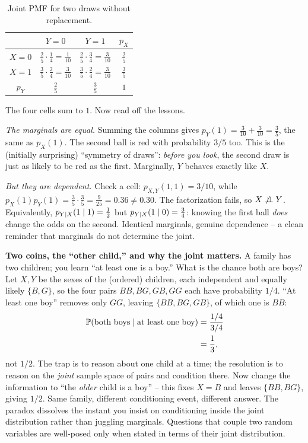\begin{example}
\begin{table}[H]
\centering
\begin{tabular}{c|cc|c}
 & $Y=0$ & $Y=1$ & $p_X$ \\
\hline
$X=0$ & $\tfrac{2}{5}\cdot\tfrac14 = \tfrac{1}{10}$
      & $\tfrac{2}{5}\cdot\tfrac34 = \tfrac{3}{10}$ & $\tfrac{2}{5}$ \\[0.6ex]
$X=1$ & $\tfrac{3}{5}\cdot\tfrac24 = \tfrac{3}{10}$
      & $\tfrac{3}{5}\cdot\tfrac24 = \tfrac{3}{10}$ & $\tfrac{3}{5}$ \\[0.6ex]
\hline
$p_Y$ & $\tfrac{2}{5}$ & $\tfrac{3}{5}$ & $1$ \\
\end{tabular}
\caption{Joint PMF for two draws without replacement.}
\label{ch13:tab-without-replacement}
\end{table}

The four cells sum to $1$. Now read off the lessons.

\emph{The marginals are equal.} Summing the columns gives
$p_Y(1) = \tfrac{3}{10}+\tfrac{3}{10} = \tfrac{3}{5}$, the same as $p_X(1)$. The
second ball is red with probability $3/5$ too. This is the (initially surprising)
``symmetry of draws'': \emph{before you look}, the second draw is just as likely
to be red as the first. Marginally, $Y$ behaves exactly like $X$.

\emph{But they are dependent.} Check a cell: $p_{X,Y}(1,1) = 3/10$, while
$p_X(1)p_Y(1) = \tfrac35\cdot\tfrac35 = \tfrac{9}{25} = 0.36 \ne 0.30$. The
factorization fails, so $X\not\perp\!\!\!\perp Y$. Equivalently, $p_{Y\mid X}(1\mid 1)
= \tfrac12$ but $p_{Y\mid X}(1\mid 0)=\tfrac34$: knowing the first ball
\emph{does} change the odds on the second. Identical marginals, genuine
dependence -- a clean reminder that marginals do not determine the joint.
\end{example}

\begin{paradoxbox}
\textbf{Two coins, the ``other child,'' and why the joint matters.} A
family has two children; you learn ``at least one is a boy.'' What is the chance
both are boys? Let $X,Y$ be the sexes of the (ordered) children, each
independent and equally likely $\{B,G\}$, so the four pairs $BB,BG,GB,GG$ each
have probability $1/4$. ``At least one boy'' removes only $GG$, leaving
$\{BB,BG,GB\}$, of which one is $BB$:
\begin{align*}
  \operatorname{\mathbb{P}}(\text{both boys}\mid \text{at least one boy}) &= \frac{1/4}{3/4} \\
  &= \frac13,
\end{align*}
not $1/2$. The trap is to reason about one child at a time; the resolution is to
reason on the \emph{joint} sample space of pairs and condition there. Now change
the information to ``the \emph{older} child is a boy'' -- this fixes $X=B$ and
leaves $\{BB, BG\}$, giving $1/2$. Same family, different conditioning event,
different answer. The paradox dissolves the instant you insist on conditioning
inside the joint distribution rather than juggling marginals. Questions that couple two random variables are well-posed only when stated in terms of
their joint distribution.
\end{paradoxbox}


